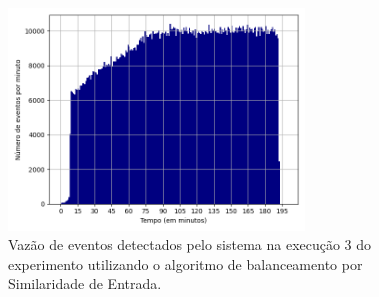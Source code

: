 


\begin{figure}[h]
\centering
\includegraphics[width=0.7\textwidth]{figuras/graphics/histogram_vazao_8-dez-is.png}
\caption{Vazão de eventos detectados pelo sistema na execução 3 do experimento utilizando o algoritmo de balanceamento por Similaridade de Entrada.}
\label{fig:vazao_8-dez-is}
\end{figure}



